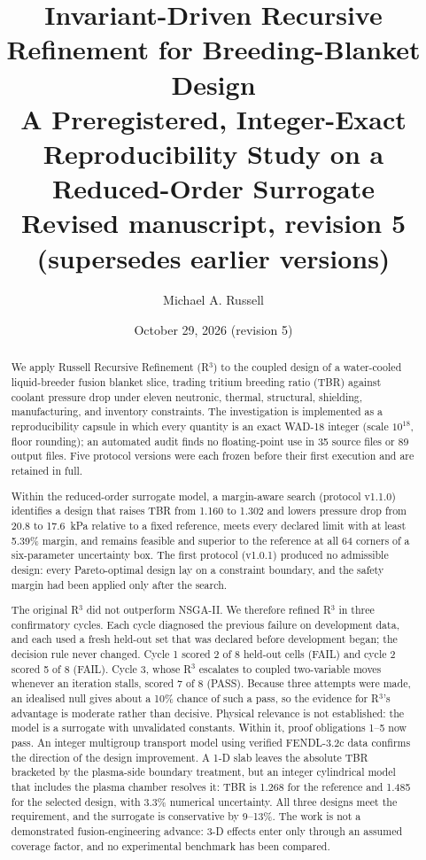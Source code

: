 \documentclass[11pt]{article}
\title{
\textbf{Invariant-Driven Recursive Refinement for Breeding-Blanket Design}\\[0.4em]
\large A Preregistered, Integer-Exact Reproducibility Study on a Reduced-Order Surrogate\\[0.2em]
\normalsize Revised manuscript, revision 5 (supersedes earlier versions)
}
\author{Michael A. Russell}
\date{October 29, 2026 (revision 5)}
\begin{document}
\maketitle

\begin{abstract}
We apply Russell Recursive Refinement (R$^3$) to the coupled design of a water-cooled
liquid-breeder fusion blanket slice, trading tritium breeding ratio (TBR) against coolant
pressure drop under eleven neutronic, thermal, structural, shielding, manufacturing, and
inventory constraints. The investigation is implemented as a reproducibility capsule in
which every quantity is an exact WAD-18 integer (scale $10^{18}$, floor rounding); an
automated audit finds no floating-point use in 35 source files or 89 output files.
Five protocol versions were each frozen before their first execution and are retained in full.

Within the reduced-order surrogate model, a margin-aware search (protocol v1.1.0) identifies a design
that raises TBR from 1.160 to 1.302 and lowers pressure drop from 20.8 to 17.6~kPa
relative to a fixed reference, meets every declared limit with at least 5.39\% margin,
and remains feasible and superior to the reference at all 64 corners of a six-parameter
uncertainty box. The first protocol (v1.0.1) produced no admissible design: every
Pareto-optimal design lay on a constraint boundary, and the safety margin had been applied
only after the search.

The original R$^3$ did not outperform NSGA-II. We therefore refined R$^3$ in three
confirmatory cycles. Each cycle diagnosed the previous failure on development data, and each
used a fresh held-out set that was declared before development began; the decision rule never
changed. Cycle 1 scored 2 of 8 held-out cells (FAIL) and cycle 2 scored 5 of 8 (FAIL). Cycle 3,
whose R$^3$ escalates to coupled two-variable moves whenever an iteration stalls, scored 7 of 8
(PASS). Because three attempts were made, an idealised null gives about a 10\% chance of such a
pass, so the evidence for R$^3$'s advantage is moderate rather than decisive. Physical relevance is
not established: the model is a surrogate with unvalidated constants. Within it, proof
obligations 1--5 now pass. An integer multigroup transport model using verified FENDL-3.2c data confirms the
direction of the design improvement. A 1-D slab leaves the absolute TBR bracketed by the plasma-side
boundary treatment, but an integer cylindrical model that includes the plasma chamber resolves it: TBR is 1.268
for the reference and 1.485 for the selected design, with 3.3\% numerical uncertainty. All three designs meet
the requirement, and the surrogate is conservative by 9--13\%. The work is not a demonstrated fusion-engineering
advance: 3-D effects enter only through an assumed coverage factor, and no experimental benchmark has been compared.
\end{abstract}
\end{document}
